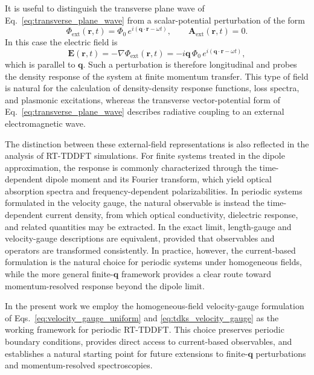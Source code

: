 It is useful to distinguish the transverse plane wave of Eq.~\eqref{eq:transverse_plane_wave} from a scalar-potential perturbation of the form
\begin{equation}
\Phi_{\mathrm{ext}}(\mathbf r,t)
=
\Phi_{0}\,e^{i(\mathbf q\cdot\mathbf r-\omega t)},
\qquad
\mathbf A_{\mathrm{ext}}(\mathbf r,t)=0.
\label{eq:scalar_probe}
\end{equation}
In this case the electric field is
\begin{equation}
\mathbf E(\mathbf r,t)
=
-\nabla \Phi_{\mathrm{ext}}(\mathbf r,t)
=
-i\mathbf q \,\Phi_{0}\,e^{i(\mathbf q\cdot\mathbf r-\omega t)},
\label{eq:longitudinal_field}
\end{equation}
which is parallel to \(\mathbf q\). Such a perturbation is therefore longitudinal and probes the density response of the system at finite momentum transfer. This type of field is natural for the calculation of density-density response functions, loss spectra, and plasmonic excitations, whereas the transverse vector-potential form of Eq.~\eqref{eq:transverse_plane_wave} describes radiative coupling to an external electromagnetic wave.

The distinction between these external-field representations is also reflected in the analysis of RT-TDDFT simulations. For finite systems treated in the dipole approximation, the response is commonly characterized through the time-dependent dipole moment and its Fourier transform, which yield optical absorption spectra and frequency-dependent polarizabilities. In periodic systems formulated in the velocity gauge, the natural observable is instead the time-dependent current density, from which optical conductivity, dielectric response, and related quantities may be extracted. In the exact limit, length-gauge and velocity-gauge descriptions are equivalent, provided that observables and operators are transformed consistently. In practice, however, the current-based formulation is the natural choice for periodic systems under homogeneous fields, while the more general finite-\(\mathbf q\) framework provides a clear route toward momentum-resolved response beyond the dipole limit.

In the present work we employ the homogeneous-field velocity-gauge formulation of Eqs.~\eqref{eq:velocity_gauge_uniform} and \eqref{eq:tdks_velocity_gauge} as the working framework for periodic RT-TDDFT. This choice preserves periodic boundary conditions, provides direct access to current-based observables, and establishes a natural starting point for future extensions to finite-\(\mathbf q\) perturbations and momentum-resolved spectroscopies.



